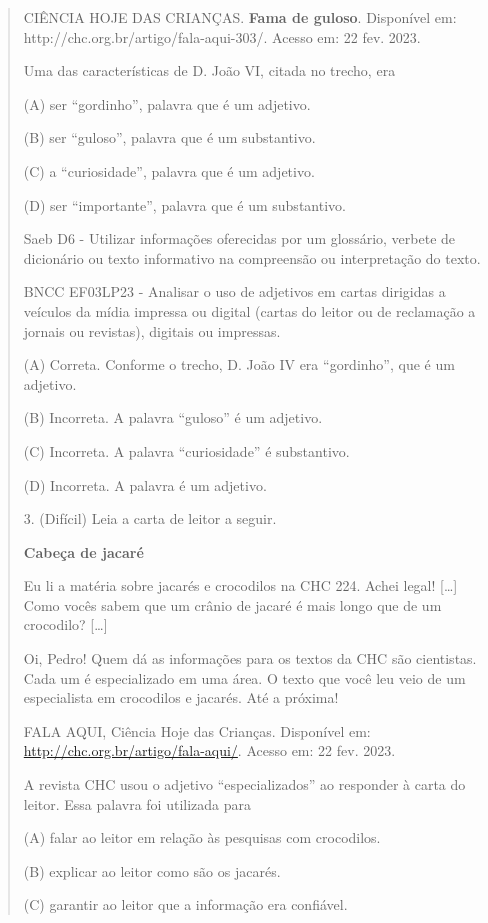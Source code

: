 \begin{quote}
CIÊNCIA HOJE DAS CRIANÇAS. \textbf{Fama de guloso}. Disponível em:
http://chc.org.br/artigo/fala-aqui-303/. Acesso em: 22 fev. 2023.

Uma das características de D. João VI, citada no trecho, era

(A) ser ``gordinho'', palavra que é um adjetivo.

(B) ser ``guloso'', palavra que é um substantivo.

(C) a ``curiosidade'', palavra que é um adjetivo.

(D) ser ``importante'', palavra que é um substantivo.

Saeb D6 - Utilizar informações oferecidas por um glossário, verbete de
dicionário ou texto informativo na compreensão ou interpretação do
texto.

BNCC EF03LP23 - Analisar o uso de adjetivos em cartas dirigidas a
veículos da mídia impressa ou digital (cartas do leitor ou de reclamação
a jornais ou revistas), digitais ou impressas.

(A) Correta. Conforme o trecho, D. João IV era ``gordinho'', que é um
adjetivo.

(B) Incorreta. A palavra ``guloso'' é um adjetivo.

(C) Incorreta. A palavra ``curiosidade'' é substantivo.

(D) Incorreta. A palavra é um adjetivo.

3. (Difícil) Leia a carta de leitor a seguir.

\textbf{Cabeça de jacaré}

Eu li a matéria sobre jacarés e crocodilos na CHC 224. Achei legal!
{[}\ldots{}{]} Como vocês sabem que um crânio de jacaré é mais longo que
de um crocodilo? {[}\ldots{}{]}

Oi, Pedro! Quem dá as informações para os textos da CHC são cientistas.
Cada um é especializado em uma área. O texto que você leu veio de um
especialista em crocodilos e jacarés. Até a próxima!

FALA AQUI, Ciência Hoje das Crianças. Disponível em:
\url{http://chc.org.br/artigo/fala-aqui/}. Acesso em: 22 fev. 2023.

A revista CHC usou o adjetivo ``especializados'' ao responder à carta do
leitor. Essa palavra foi utilizada para

(A) falar ao leitor em relação às pesquisas com crocodilos.

(B) explicar ao leitor como são os jacarés.

(C) garantir ao leitor que a informação era confiável.


\end{quote}
